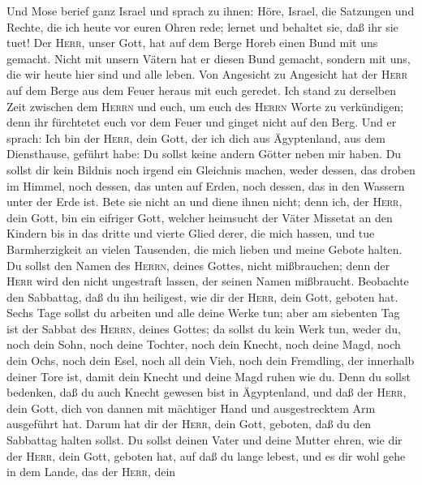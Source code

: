  Und Mose berief ganz Israel und sprach zu ihnen: Höre,
Israel, die Satzungen und Rechte, die ich heute vor euren Ohren rede;
lernet und behaltet sie, daß ihr sie tuet!  Der
\textsc{Herr}, unser Gott, hat auf dem Berge Horeb einen Bund mit uns
gemacht.  Nicht mit unsern Vätern hat er diesen Bund
gemacht, sondern mit uns, die wir heute hier sind und alle leben.
 Von Angesicht zu Angesicht hat der \textsc{Herr} auf dem
Berge aus dem Feuer heraus mit euch geredet.  Ich stand zu
derselben Zeit zwischen dem \textsc{Herrn} und euch, um euch des
\textsc{Herrn} Worte zu verkündigen; denn ihr fürchtetet euch vor dem
Feuer und ginget nicht auf den Berg. Und er sprach:  Ich
bin der \textsc{Herr}, dein Gott, der ich dich aus Ägyptenland, aus dem
Diensthause, geführt habe:  Du sollst keine andern Götter
neben mir haben.  Du sollst dir kein Bildnis noch irgend
ein Gleichnis machen, weder dessen, das droben im Himmel, noch dessen,
das unten auf Erden, noch dessen, das in den Wassern unter der Erde ist.
 Bete sie nicht an und diene ihnen nicht; denn ich, der
\textsc{Herr}, dein Gott, bin ein eifriger Gott, welcher heimsucht der
Väter Missetat an den Kindern bis in das dritte und vierte Glied derer,
die mich hassen,  und tue Barmherzigkeit an vielen
Tausenden, die mich lieben und meine Gebote halten.  Du
sollst den Namen des \textsc{Herrn}, deines Gottes, nicht mißbrauchen;
denn der \textsc{Herr} wird den nicht ungestraft lassen, der seinen
Namen mißbraucht.  Beobachte den Sabbattag, daß du ihn
heiligest, wie dir der \textsc{Herr}, dein Gott, geboten hat.
 Sechs Tage sollst du arbeiten und alle deine Werke tun;
 aber am siebenten Tag ist der Sabbat des \textsc{Herrn},
deines Gottes; da sollst du kein Werk tun, weder du, noch dein Sohn,
noch deine Tochter, noch dein Knecht, noch deine Magd, noch dein Ochs,
noch dein Esel, noch all dein Vieh, noch dein Fremdling, der innerhalb
deiner Tore ist, damit dein Knecht und deine Magd ruhen wie du.
 Denn du sollst bedenken, daß du auch Knecht gewesen bist
in Ägyptenland, und daß der \textsc{Herr}, dein Gott, dich von dannen
mit mächtiger Hand und ausgestrecktem Arm ausgeführt hat. Darum hat dir
der \textsc{Herr}, dein Gott, geboten, daß du den Sabbattag halten
sollst.  Du sollst deinen Vater und deine Mutter ehren,
wie dir der \textsc{Herr}, dein Gott, geboten hat, auf daß du lange
lebest, und es dir wohl gehe in dem Lande, das der \textsc{Herr}, dein
